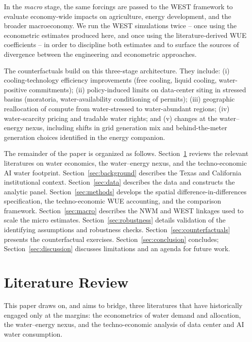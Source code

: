 \documentclass[11pt, letterpaper]{article}
\begin{document}
In the \emph{macro} stage, the same forcings are passed to the WEST framework \citep{reimer2020west} to evaluate economy-wide impacts on agriculture, energy development, and the broader macroeconomy. We run the WEST simulations twice -- once using the econometric estimates produced here, and once using the literature-derived WUE coefficients -- in order to discipline both estimates and to surface the sources of divergence between the engineering and econometric approaches.

The counterfactuals build on this three-stage architecture. They include: (i) cooling-technology efficiency improvements (free cooling, liquid cooling, water-positive commitments); (ii) policy-induced limits on data-center siting in stressed basins (moratoria, water-availability conditioning of permits); (iii) geographic reallocation of compute from water-stressed to water-abundant regions; (iv) water-scarcity pricing and tradable water rights; and (v) changes at the water--energy nexus, including shifts in grid generation mix and behind-the-meter generation choices identified in the energy companion.

The remainder of the paper is organized as follows. Section~\ref{sec:litreview} reviews the relevant literatures on water economics, the water--energy nexus, and the techno-economic AI water footprint. Section~\ref{sec:background} describes the Texas and California institutional context. Section~\ref{sec:data} describes the data and constructs the analytic panel. Section~\ref{sec:methods} develops the spatial difference-in-differences specification, the techno-economic WUE accounting, and the comparison framework. Section~\ref{sec:macro} describes the NWM and WEST linkages used to scale the micro estimates. Section~\ref{sec:robustness} details validation of the identifying assumptions and robustness checks. Section~\ref{sec:counterfactuals} presents the counterfactual exercises. Section~\ref{sec:conclusion} concludes; Section~\ref{sec:discussion} discusses limitations and an agenda for future work.


\section{Literature Review}
\label{sec:litreview}

This paper draws on, and aims to bridge, three literatures that have historically engaged only at the margins: the econometrics of water demand and allocation, the water--energy nexus, and the techno-economic analysis of data center and AI water consumption.
\end{document}
